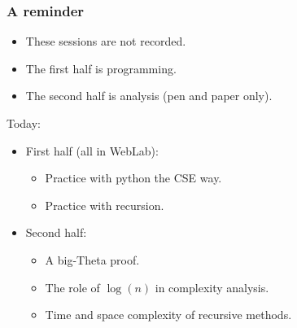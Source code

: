\begin{frame}
	\frametitle{A reminder}
	\begin{itemize}
		\item These sessions are not recorded.
		\item The first half is programming.
		\item The second half is analysis (pen and paper only).
	\end{itemize}
	Today:
	\begin{itemize}
		\item First half (all in WebLab):
			\begin{itemize}
				\item Practice with python the CSE way.
				\item Practice with recursion.
			\end{itemize}
		\item Second half:
			\begin{itemize}
				\item A big-Theta proof.
				\item The role of $\log(n)$ in complexity analysis.
				\item Time and space complexity of recursive methods.
			\end{itemize}
	\end{itemize}
\end{frame}

